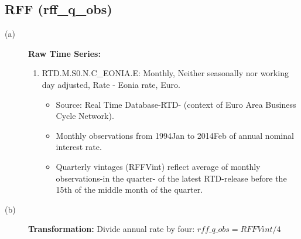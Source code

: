 \documentclass[3p,review,times]{elsarticle}		%
\begin{document}
\subsection{RFF (rff\_q\_obs)}
\begin{description}
	\item[(a)] \textbf{Raw Time Series:} 
	\begin{enumerate}
		\item RTD.M.S0.N.C\_EONIA.E: Monthly, Neither seasonally nor working day adjusted, Rate - Eonia rate, Euro.
		\begin{itemize}
			\item Source: Real Time Database-RTD- (context of Euro Area Business Cycle Network). 
			\item Monthly observations from 1994Jan to 2014Feb of annual nominal interest rate. 
			\item Quarterly vintages (RFFVint) reflect average of monthly observations-in the quarter- of the latest RTD-release before the 15th of the middle month of the quarter.  
		\end{itemize} 			
	\end{enumerate}
	\item[(b)] \textbf{Transformation:} Divide annual rate by four: $rff\_q\_obs=RFFVint/4$
	
	
\end{description}
\end{document}
